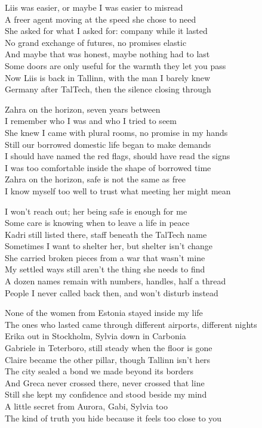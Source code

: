 \begin{lyrics}
Liis was easier, or maybe I was easier to misread\\
A freer agent moving at the speed she chose to need\\
She asked for what I asked for: company while it lasted\\
No grand exchange of futures, no promises elastic\\
And maybe that was honest, maybe nothing had to last\\
Some doors are only useful for the warmth they let you pass\\
Now Liis is back in Tallinn, with the man I barely knew\\
Germany after TalTech, then the silence closing through

Zahra on the horizon, seven years between\\
I remember who I was and who I tried to seem\\
She knew I came with plural rooms, no promise in my hands\\
Still our borrowed domestic life began to make demands\\
I should have named the red flags, should have read the signs\\
I was too comfortable inside the shape of borrowed time\\
Zahra on the horizon, safe is not the same as free\\
I know myself too well to trust what meeting her might mean

I won't reach out; her being safe is enough for me\\
Some care is knowing when to leave a life in peace\\
Kadri still listed there, staff beneath the TalTech name\\
Sometimes I want to shelter her, but shelter isn't change\\
She carried broken pieces from a war that wasn't mine\\
My settled ways still aren't the thing she needs to find\\
A dozen names remain with numbers, handles, half a thread\\
People I never called back then, and won't disturb instead

None of the women from Estonia stayed inside my life\\
The ones who lasted came through different airports, different nights\\
Erika out in Stockholm, Sylvia down in Carbonia\\
Gabriele in Teterboro, still steady when the floor is gone\\
Claire became the other pillar, though Tallinn isn't hers\\
The city sealed a bond we made beyond its borders\\
And Greca never crossed there, never crossed that line\\
Still she kept my confidence and stood beside my mind\\
A little secret from Aurora, Gabi, Sylvia too\\
The kind of truth you hide because it feels too close to you


\end{lyrics}

